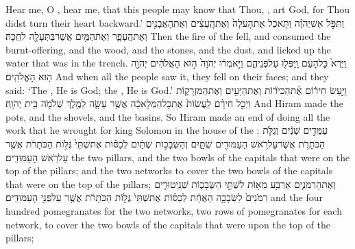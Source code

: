 {Hear me, O \lord, hear me, that this people may know that Thou, \lord, art God, for Thou didst turn their heart backward.’}
{וַתִּפֹּ֣ל אֵשׁ\maqqaf יְהֹוָ֗ה וַתֹּ֤אכַל אֶת\maqqaf הָעֹלָה֙ וְאֶת\maqqaf הָֽעֵצִ֔ים וְאֶת\maqqaf הָאֲבָנִ֖ים וְאֶת\maqqaf הֶֽעָפָ֑ר וְאֶת\maqqaf הַמַּ֥יִם אֲשֶׁר\maqqaf בַּתְּעָלָ֖ה לִחֵֽכָה׃}
{Then the fire of the \lord\space fell, and consumed the burnt-offering, and the wood, and the stones, and the dust, and licked up the water that was in the trench.}
{וַיַּרְא֙ כׇּל\maqqaf הָעָ֔ם וַֽיִּפְּל֖וּ עַל\maqqaf פְּנֵיהֶ֑ם וַיֹּ֣אמְר֔וּ יְהֹוָה֙ ה֣וּא הָאֱלֹהִ֔ים יְהֹוָ֖ה ה֥וּא הָאֱלֹהִֽים׃}
{And when all the people saw it, they fell on their faces; and they said: ‘The \lord, He is God; the \lord, He is God.’}
\label{haft_22}
\setcounter{chap}{7}
\setcounter{verse}{40}
{וַיַּ֣עַשׂ חִיר֔וֹם אֶ֨ת\maqqaf הַכִּיֹּר֔וֹת וְאֶת\maqqaf הַיָּעִ֖ים וְאֶת\maqqaf הַמִּזְרָק֑וֹת וַיְכַ֣ל חִירָ֗ם לַֽעֲשׂוֹת֙ אֶת\maqqaf כׇּל\maqqaf הַמְּלָאכָ֔ה אֲשֶׁ֥ר עָשָׂ֛ה לַמֶּ֥לֶךְ שְׁלֹמֹ֖ה בֵּ֥ית יְהֹוָֽה׃}
{And Hiram made the pots, and the shovels, and the basins. So Hiram made an end of doing all the work that he wrought for king Solomon in the house of the \lord:}
{עַמֻּדִ֣ים שְׁנַ֔יִם וְגֻלֹּ֧ת הַכֹּתָרֹ֛ת אֲשֶׁר\maqqaf עַל\maqqaf רֹ֥אשׁ הָעַמּוּדִ֖ים שְׁתָּ֑יִם וְהַשְּׂבָכ֣וֹת שְׁתַּ֔יִם לְכַסּ֗וֹת אֶת\maqqaf שְׁתֵּי֙ גֻּלּ֣וֹת הַכֹּתָרֹ֔ת אֲשֶׁ֖ר עַל\maqqaf רֹ֥אשׁ הָעַמּוּדִֽים׃}
{the two pillars, and the two bowls of the capitals that were on the top of the pillars; and the two networks to cover the two bowls of the capitals that were on the top of the pillars;}
{וְאֶת\maqqaf הָרִמֹּנִ֛ים אַרְבַּ֥ע מֵא֖וֹת לִשְׁתֵּ֣י הַשְּׂבָכ֑וֹת שְׁנֵֽי\maqqaf טוּרִ֤ים רִמֹּנִים֙ לַשְּׂבָכָ֣ה הָאֶחָ֔ת לְכַסּ֗וֹת אֶת\maqqaf שְׁתֵּי֙ גֻּלּ֣וֹת הַכֹּתָרֹ֔ת אֲשֶׁ֖ר עַל\maqqaf פְּנֵ֥י הָעַמּוּדִֽים׃}
{and the four hundred pomegranates for the two networks, two rows of pomegranates for each network, to cover the two bowls of the capitals that were upon the top of the pillars;}
